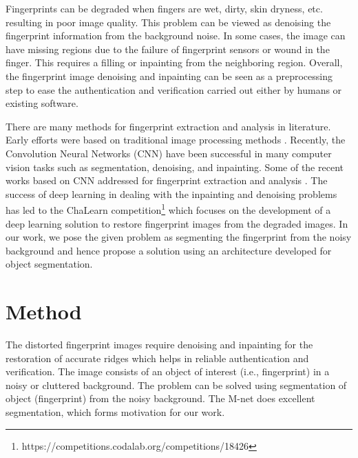 \documentclass{llncs}
\begin{document}
Fingerprints can be degraded when fingers are wet, dirty, skin dryness, etc. resulting in poor image quality. This problem can be viewed as denoising the fingerprint information from the background noise. In some cases, the image can have missing regions due to the failure of fingerprint sensors or wound in the finger. This requires a filling or inpainting from the neighboring region. Overall, the fingerprint image denoising and inpainting can be seen as a preprocessing step to ease the authentication and verification carried out either by humans or existing software.

There are many methods for fingerprint extraction and analysis in literature. Early efforts were based on traditional image processing methods \cite{hong1998fingerprint,greenberg2002fingerprint,wu2004fingerprint,rahmes2007fingerprint,khan2011fingerprint,singh2015fingerprint}. Recently, the Convolution Neural Networks (CNN) have been successful in many computer vision tasks such as segmentation, denoising, and inpainting. Some of the recent works based on CNN addressed for fingerprint extraction and analysis \cite{sahasrabudhe2014fingerprint,tang2017fingernet,nguyen2017robust,li2018deep}. The success of deep learning in dealing with the inpainting and denoising \cite{xie2012image} problems has led to the ChaLearn competition\footnote{https://competitions.codalab.org/competitions/18426} which focuses on the development of a deep learning solution to restore fingerprint images from the degraded images. In our work, we pose the given problem as segmenting the fingerprint from the noisy background and hence propose a solution using an architecture developed for object segmentation.

\section{Method}
\label{sec:method}
The distorted fingerprint images require denoising and inpainting for the restoration of accurate ridges which helps in reliable authentication and verification. The image consists of an object of interest (i.e., fingerprint) in a noisy or cluttered background. The problem can be solved using segmentation of object (fingerprint) from the noisy background. The M-net \cite{mehta2017m} does excellent segmentation, which forms motivation for our work.
\end{document}
